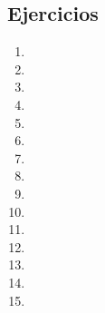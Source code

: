 \subsection{Ejercicios}

\begin{enumerate}
    \item 
    \item 
    \item 
    \item 
    \item 
    \item 
    \item 
    \item 
    \item 
    \item 
    \item 
    \item 
    \item 
    \item 
    \item 
\end{enumerate}